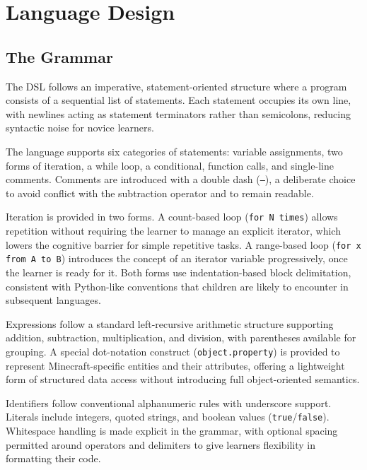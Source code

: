 \chapter{Language Design}



\section{The Grammar}

The DSL follows an imperative, statement-oriented structure where a program consists of a sequential list of statements. 
Each statement occupies its own line, with newlines acting as statement terminators rather than semicolons, reducing syntactic noise for novice learners.

The language supports six categories of statements: variable assignments, two forms of iteration, a while loop, a conditional, function calls, and single-line comments. 
Comments are introduced with a double dash (\texttt{--}), a deliberate choice to avoid conflict with the subtraction operator and to remain readable.

Iteration is provided in two forms. 
A count-based loop (\texttt{for N times}) allows repetition without requiring the learner to manage an explicit iterator, which lowers the cognitive barrier for simple repetitive tasks. 
A range-based loop (\texttt{for x from A to B}) introduces the concept of an iterator variable progressively, once the learner is ready for it. 
Both forms use indentation-based block delimitation, consistent with Python-like conventions that children are likely to encounter in subsequent languages.

Expressions follow a standard left-recursive arithmetic structure supporting addition, subtraction, multiplication, and division, with parentheses available for grouping. 
A special dot-notation construct (\texttt{object.property}) is provided to represent Minecraft-specific entities and their attributes, offering a lightweight form of structured data access without introducing full object-oriented semantics.

Identifiers follow conventional alphanumeric rules with underscore support. 
Literals include integers, quoted strings, and boolean values (\texttt{true}/\texttt{false}). 
Whitespace handling is made explicit in the grammar, with optional spacing permitted around operators and delimiters to give learners flexibility in formatting their code.

